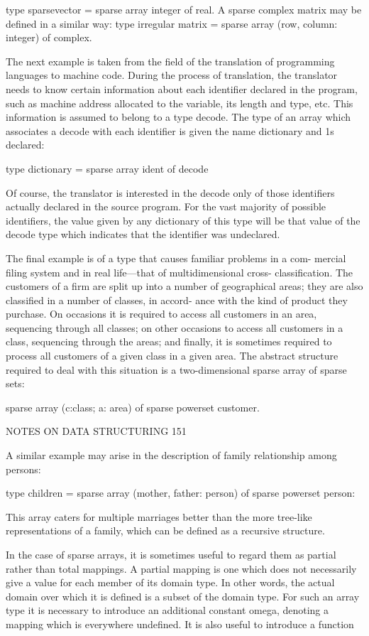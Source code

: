 {{		type sparsevector = sparse array integer of real. A sparse complex matrix may be defined in a similar way: type irregular matrix = sparse array (row, column: integer) of complex.
		
		The next example is taken from the field of the translation of programming languages to machine code. During the process of translation, the translator needs to know certain information about each identifier declared in the program, such as machine address allocated to the variable, its length and type, etc. This information is assumed to belong to a type decode. The type of an array which associates a decode with each identifier is given the name dictionary and 1s declared:
		
		type dictionary = sparse array ident of decode
		
		Of course, the translator is interested in the decode only of those identifiers actually declared in the source program. For the vast majority of possible identifiers, the value given by any dictionary of this type will be that value of the decode type which indicates that the identifier was undeclared.
		
		The final example is of a type that causes familiar problems in a com- mercial filing system and in real life—that of multidimensional cross- classification. The customers of a firm are split up into a number of geographical areas; they are also classified in a number of classes, in accord- ance with the kind of product they purchase. On occasions it is required to access all customers in an area, sequencing through all classes; on other occasions to access all customers in a class, sequencing through the areas; and finally, it is sometimes required to process all customers of a given class in a given area. The abstract structure required to deal with this situation is a two-dimensional sparse array of sparse sets:
		
		sparse array (c:class; a: area) of sparse powerset customer.
		
		NOTES ON DATA STRUCTURING 151
		
		A similar example may arise in the description of family relationship among persons:
		
		type children = sparse array (mother, father: person) of sparse powerset person:
		
		This array caters for multiple marriages better than the more tree-like representations of a family, which can be defined as a recursive structure.
		
		In the case of sparse arrays, it is sometimes useful to regard them as partial rather than total mappings. A partial mapping is one which does not necessarily give a value for each member of its domain type. In other words, the actual domain over which it is defined is a subset of the domain type. For such an array type it is necessary to introduce an additional constant omega, denoting a mapping which is everywhere undefined. It is also useful to introduce a function
		
}}
